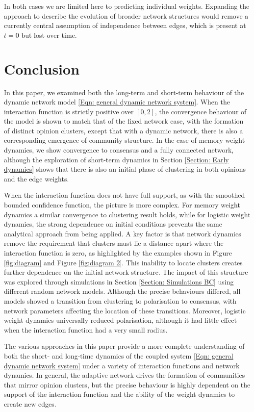 \documentclass{article}
\begin{document}
In both cases we are limited here to predicting individual weights. Expanding the approach to describe the evolution of broader network structures would remove a currently central assumption of independence between edges, which is present at $t=0$ but lost over time. 

\section{Conclusion} \label{Section: Conclusion}

In this paper, we examined both the long-term and short-term behaviour of the dynamic network model \eqref{Eqn: general dynamic network system}. When the interaction function is strictly positive over $[0,2]$, the convergence behaviour of the model is shown to match that of the fixed network case, with the formation of distinct opinion clusters, except that with a dynamic network, there is also a corresponding emergence of community structure. In the case of memory weight dynamics, we show convergence to consensus and a fully connected network, although the exploration of short-term dynamics in Section \ref{Section: Early dynamics} shows that there is also an initial phase of clustering in both opinions and the edge weights. 

When the interaction function does not have full support, as with the smoothed bounded confidence function, the picture is more complex. For memory weight dynamics a similar convergence to clustering result holds, while for logistic weight dynamics, the strong dependence on initial conditions prevents the same analytical approach from being applied. A key factor is that network dynamics remove the requirement that clusters must lie a distance apart where the interaction function is zero, as highlighted by the examples shown in Figure \ref{fig:diagram} and Figure \ref{fig:diagram 2}. This inability to locate clusters creates further dependence on the initial network structure. The impact of this structure was explored through simulations in Section \ref{Section: Simulations BC} using different random network models. Although the precise behaviours differed, all models showed a transition from clustering to polarisation to consensus, with network parameters affecting the location of these transitions. Moreover, logistic weight dynamics universally reduced polarisation, although it had little effect when the interaction function had a very small radius.

The various approaches in this paper provide a more complete understanding of both the short- and long-time dynamics of the coupled system \eqref{Eqn: general dynamic network system} under a variety of interaction functions and network dynamics. In general, the adaptive network drives the formation of communities that mirror opinion clusters, but the precise behaviour is highly dependent on the support of the interaction function and the ability of the weight dynamics to create new edges. 
\end{document}
